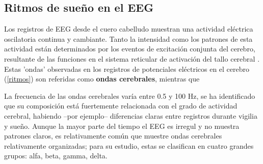 

\subsection{Ritmos de sue\~no en el EEG}

Los registros de EEG desde el cuero cabelludo muestran una actividad el\'ectrica oscilatoria 
continua y cambiante. Tanto la intensidad como los patrones de esta actividad est\'an determinados
por los eventos de excitaci\'on conjunta del cerebro, resultante de las funciones en el
sistema reticular de activaci\'on del tallo cerebral \cite{Clark98}.
Estas 'ondas' observadas en los registros de potenciales el\'ectricos en el cerebro 
(\ref{ritmos}) son referidas como
\textbf{ondas cerebrales}, mientras que %

La frecuencia de las ondas cerebrales var\'ia entre 0.5 y 100 Hz, 
se ha identificado que su composici\'on est\'a fuertemente
relacionada con el grado de actividad cerebral, habiendo --por ejemplo-- diferencias claras
entre registros durante vigilia y sue\~no.
Aunque la mayor parte del tiempo el EEG es irregul y no muestra patrones claros,
es relativamente com\'un que muestre ondas cerebrales relativamente organizadas; para su estudio,
estas se clasifican en cuatro grandes grupos: alfa, beta, gamma, delta.


